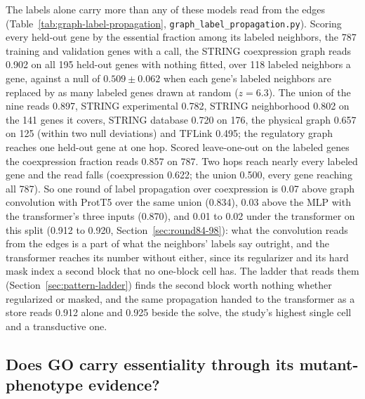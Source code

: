 The labels alone carry more than any of these models read from the edges
(Table~\ref{tab:graph-label-propagation}, \texttt{graph\_label\_propagation.py}). Scoring
every held-out gene by the essential fraction among its labeled neighbors, the 787
training and validation genes with a call, the STRING coexpression graph reads 0.902 on
all 195 held-out genes with nothing fitted, over 118 labeled neighbors a gene, against a
null of $0.509 \pm 0.062$ when each gene's labeled neighbors are replaced by as many
labeled genes drawn at random ($z = 6.3$). The union of the nine reads 0.897, STRING
experimental 0.782, STRING neighborhood 0.802 on the 141 genes it covers, STRING
database 0.720 on 176, the physical graph 0.657 on 125 (within two null deviations) and
TFLink 0.495; the regulatory graph reaches one held-out gene at one hop. Scored
leave-one-out on the labeled genes the coexpression fraction reads 0.857 on 787. Two
hops reach nearly every labeled gene and the read falls (coexpression 0.622; the union
0.500, every gene reaching all 787). So one round of label propagation over coexpression
is 0.07 above graph convolution with ProtT5 over the same union (0.834), 0.03 above the
MLP with the transformer's three inputs (0.870), and 0.01 to 0.02 under the transformer
on this split (0.912 to 0.920, Section~\ref{sec:round84-98}): what the convolution reads
from the edges is a part of what the neighbors' labels say outright, and the transformer
reaches its number without either, since its regularizer and its hard mask index a
second block that no one-block cell has. The ladder that reads them
(Section~\ref{sec:pattern-ladder}) finds the second block worth nothing whether
regularized or masked, and the same propagation handed to the transformer as a store
reads 0.912 alone and 0.925 beside the solve, the study's highest single cell and a
transductive one.



\subsection{Does GO carry essentiality through its mutant-phenotype evidence?}
\label{sec:go-evidence}

